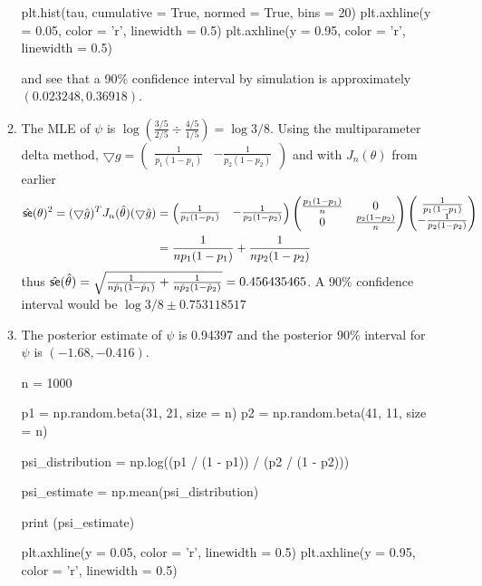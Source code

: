 \documentclass[a4paper,10pt]{article}
\theoremstyle{definition}
\begin{document}
\begin{enumerate}
\begin{enumerate}
\begin{python}
plt.hist(tau, cumulative = True, normed = True, bins = 20)
plt.axhline(y = 0.05, color = 'r', linewidth = 0.5)
plt.axhline(y = 0.95, color = 'r', linewidth = 0.5)
\end{python}
and see that a 90\% confidence interval by simulation is approximately $(0.023248,0.36918)$.


\item The {\sffamily MLE} of $\psi$ is $\log\left(\frac{3/5}{2/5}\div\frac{4/5}{1/5}\right) = \log 3/8$. Using the multiparameter delta method, $\bigtriangledown g = \begin{pmatrix}\frac{1}{p_1(1-p_1)}&-\frac{1}{p_2(1-p_2)}\end{pmatrix}$ and with $J_n(\theta)$ from earlier
\begin{align*}
\hat{\text{\sffamily se}}(\theta)^2 = (\bigtriangledown \hat{g})^T J_n(\hat{\theta}) (\bigtriangledown \hat{g}) &= \begin{pmatrix}\frac{1}{p_1(1-p_1)}&-\frac{1}{p_2(1-p_2)}\end{pmatrix}\begin{pmatrix} \frac{p_1(1-p_1)}{n} & 0 \\ 0 & \frac{p_2(1-p_2)}{n}\end{pmatrix}\begin{pmatrix}\frac{1}{p_1(1-p_1)}\\-\frac{1}{p_2(1-p_2)}\end{pmatrix}\\
&=\frac{1}{np_1(1-p_1)}+\frac{1}{np_2(1-p_2)}
\end{align*}
thus $\hat{\text{\sffamily se}}(\hat{\theta}) = \sqrt{\frac{1}{n\hat{p}_1(1-\hat{p}_1)}+\frac{1}{n\hat{p}_2(1-\hat{p}_2)}} = 0.456435465$. A 90\% confidence interval would be $\log3/8 \pm 0.753118517$


\item The posterior estimate of $\psi$ is 0.94397 and the posterior 90\% interval for $\psi$ is $(-1.68,-0.416)$.

\begin{python}
n = 1000

p1 = np.random.beta(31, 21, size = n)
p2 = np.random.beta(41, 11, size = n)

psi_distribution = np.log((p1 / (1 - p1)) / (p2 / (1 - p2)))

psi_estimate = np.mean(psi_distribution)

print (psi_estimate)

plt.axhline(y = 0.05, color = 'r', linewidth = 0.5)
plt.axhline(y = 0.95, color = 'r', linewidth = 0.5)


\end{python}
\end{enumerate}
\end{enumerate}
\end{document}
